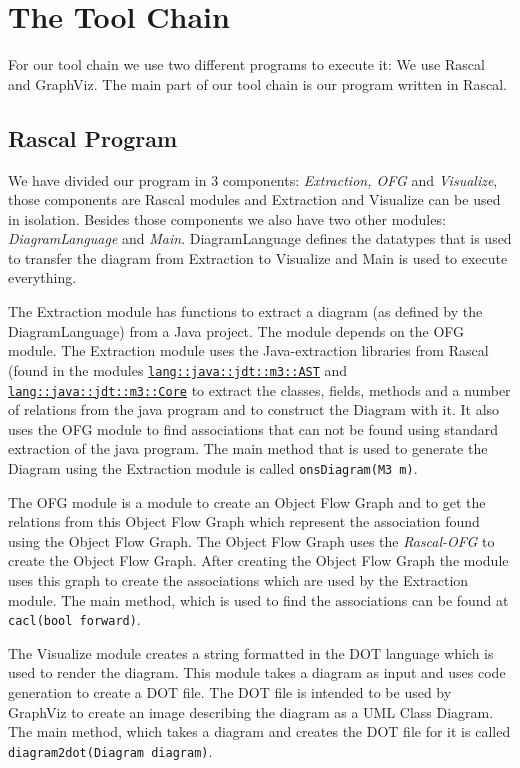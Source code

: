 \documentclass[a4paper,11pt]{article}
\begin{document}
	\section{The Tool Chain}
	For our tool chain we use two different programs to execute it: We use Rascal and GraphViz.
	The main part of our tool chain is our program written in Rascal.
	
	\subsection{Rascal Program}
	
	We have divided our program in 3 components: \emph{Extraction, OFG} and \emph{Visualize}, those components are Rascal modules and Extraction and Visualize can be used in isolation. 
	Besides those components we also have two other modules: \emph{DiagramLanguage} and \emph{Main}.
	DiagramLanguage defines the datatypes that is used to transfer the diagram from Extraction to Visualize and Main is used to execute everything.
	
	The Extraction module has functions to extract a diagram (as defined by the DiagramLanguage) from a Java project. The module depends on the OFG module.
	The Extraction module uses the Java-extraction libraries from Rascal (found in the modules \texttt{\url{lang::java::jdt::m3::AST}} and \texttt{\url{lang::java::jdt::m3::Core}} to extract the classes, fields, methods and a number of relations from the java program and to construct the Diagram with it.
	It also uses the OFG module to find associations that can not be found using standard extraction of the java program.
	The main method that is used to generate the Diagram using the Extraction module is called \texttt{onsDiagram(M3 m)}.
	
	The OFG module is a module to create an Object Flow Graph and to get the relations from this Object Flow Graph which represent the association found using the Object Flow Graph.
	The Object Flow Graph uses the \emph{Rascal-OFG}\cite{rascal-ofg} to create the Object Flow Graph.
	After creating the Object Flow Graph the module uses this graph to create the associations which are used by the Extraction module.
	The main method, which is used to find the associations can be found at \texttt{cacl(bool forward)}.
	
	The Visualize module creates a string formatted in the DOT language which is used to render the diagram.
	This module takes a diagram as input and uses code generation to create a DOT file.
	The DOT file is intended to be used by GraphViz to create an image describing the diagram as a UML Class Diagram.
	The main method, which takes a diagram and creates the DOT file for it is called \texttt{diagram2dot(Diagram diagram)}.
	
\end{document}
